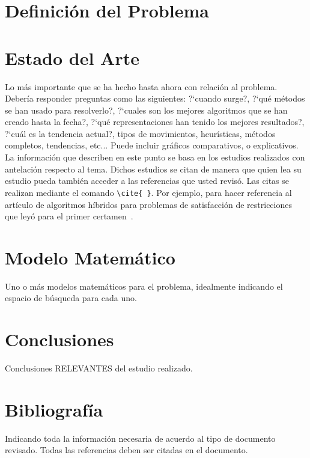 \documentclass[letter, 11pt]{article}
\begin{document}
\section{Definición del Problema}


\section{Estado del Arte}
Lo m\'as importante que se ha hecho hasta ahora con relaci\'on al problema. Deber\'ia responder preguntas como las siguientes:
?`cuando surge?, ?`qu\'e m\'etodos se han usado para resolverlo?, ?`cuales son los mejores algoritmos que se han creado hasta
la fecha?, ?`qu\'e representaciones han tenido los mejores resultados?, ?`cu\'al es la tendencia actual?, tipos de movimientos,
heur\'isticas, m\'etodos completos, tendencias, etc... Puede incluir gr\'aficos comparativos, o explicativos.\\
La informaci\'on que describen en este punto se basa en los estudios realizados con antelaci\'on respecto al tema.
Dichos estudios se citan de manera que quien lea su estudio pueda tambi\'en
 acceder a las referencias que usted revis\'o. Las citas se realizan mediante el comando \verb+\cite{ }+.
Por ejemplo, para hacer referencia al art\'iculo de algoritmos h\'ibridos para problemas de satisfacci\'on 
 de restricciones que ley\'o para el primer certamen~\cite{Prosser93Hybrid}.

\section{Modelo Matem\'atico}
Uno o m\'as modelos matem\'aticos para el problema, idealmente indicando el espacio de b\'usqueda para cada uno.

\section{Conclusiones}
Conclusiones RELEVANTES del estudio realizado.

\section{Bibliograf\'ia}
Indicando toda la informaci\'on necesaria de acuerdo al tipo de documento revisado. Todas las referencias deben ser 
citadas en el documento.


\end{document}
